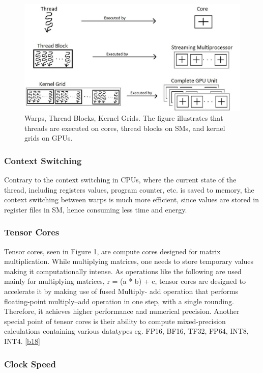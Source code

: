 \documentclass[conference]{IEEEtran}
\begin{document}
\begin{figure}[H]
    \centering
    \includegraphics[scale=0.46]{kernel_grid.jpeg}
    \caption{Warps, Thread Blocks, Kernel Grids. The figure illustrates that threads are executed on cores, thread blocks on SMs, and kernel grids on GPUs.}
    \label{fig:enter-label}
\end{figure}

\subsubsection{Context Switching}
Contrary to the context switching in CPUs, where the current state of the thread, including registers values, program counter, etc. is saved to memory, the context switching between warps is much more efficient, since values are stored in register files in SM, hence consuming less time and energy. \cite{b2}
\subsubsection{Tensor Cores}


Tensor cores, seen in Figure 1, are compute cores designed for matrix multiplication. While multiplying matrices, one needs to store temporary values making it computationally intense. As operations like the following are used mainly for multiplying matrices,  r = (a * b) + c,  tensor cores are designed to accelerate it by making use of fused Multiply- add operation that performs floating-point multiply–add operation in one step, with a single rounding.  Therefore, it achieves higher performance and numerical precision. Another special point of tensor cores is their ability to compute mixed-precision calculations containing various datatypes eg. FP16, BF16, TF32, FP64, INT8, INT4. \ref{b18}


\subsubsection{Clock Speed}
\end{document}
